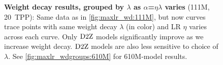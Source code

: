 \begin{figure}
  \centering
  \vspace{0mm}
  \caption{\textbf{Weight decay results, grouped by $\lambda$ as
      $\alpha$=$\eta\lambda$ varies} (111M, 20~TPP):
    Same data as in \cref{fig:maxlr_wd:111M}, but now curves trace
    points with same weight decay $\lambda$ (in color) and LR $\eta$
    varies across each curve.  Only $\mbox{D2Z}$ models significantly
    improve as we increase weight decay.  $\mbox{D2Z}$ models are also less
    sensitive to choice of $\lambda$.  See
    \cref{fig:maxlr_wdgroups:610M} for 610M-model
    results.\label{fig:maxlr_wdgroups:111M}}
\end{figure}
